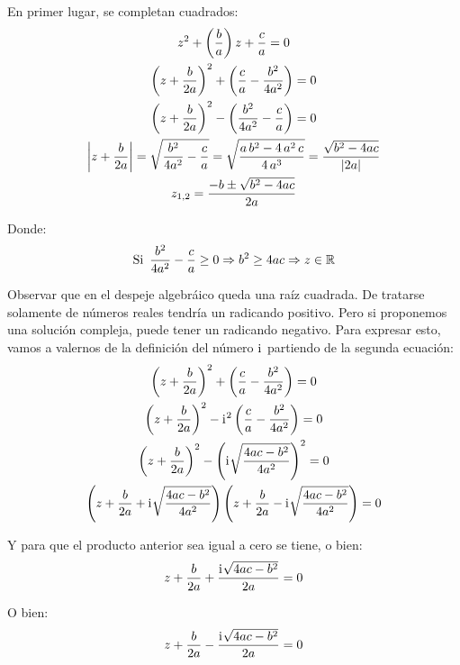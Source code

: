 \documentclass[a5paper,12pt,twoside]{book}
\begin{document}
En primer lugar, se completan cuadrados:
\begin{gather*}
    z^2 + \left(\frac{b}{a} \right) z + \frac{c}{a} = 0
    \\
    \left( z+\frac{b}{2a} \right)^2 + \left( \frac{c}{a}-\frac{b^2}{4a^2} \right) = 0
    \\
    \left( z+\frac{b}{2a} \right)^2 - \left( \frac{b^2}{4a^2} - \frac{c}{a} \right) = 0
    \\
    {\left| {z+\frac{b}{2a}} \right|} = \sqrt{\frac{b^2}{4a^2} - \frac{c}{a}}
    = \sqrt{\frac{a \, b^2 - 4 \, a^2 \, c}{4 \, a^3}}
    = \frac{\sqrt{b^2 - 4ac}}{{\left| {2a} \right|}}
    \\
    z_{1,2} = \frac{-b \pm \sqrt{b^2-4ac}}{2a}
\end{gather*}

Donde:
\begin{equation*}
    \textrm{Si} \enspace \frac{b^2}{4a^2} - \frac{c}{a} \geq 0 \Rightarrow b^2 \geq 4ac \Rightarrow z \in \mathbb{R}
\end{equation*}

Observar que en el despeje algebráico queda una raíz cuadrada.
De tratarse solamente de números reales tendría un radicando positivo.
Pero si proponemos una solución compleja, puede tener un radicando negativo.
Para expresar esto, vamos a valernos de la definición del número $\mathrm{i}\mkern1mu$ partiendo de la segunda ecuación:
\begin{gather*}
    \left( z+\frac{b}{2a} \right)^2 + \left( \frac{c}{a} - \frac{b^2}{4a^2} \right) = 0
    \\
    \left( z+\frac{b}{2a} \right)^2 - \iu^2 \left( \frac{c}{a}-\frac{b^2}{4a^2} \right) = 0
    \\
    \left( z+\frac{b}{2a} \right)^2 - \left( \iu \sqrt{\frac{4ac-b^2}{4a^2}} \right)^2 = 0
    \\
    \scale{0.98}
    {
    \left( z+\frac{b}{2a} + \iu \sqrt{\frac{4ac-b^2}{4a^2}} \right) \left( z+\frac{b}{2a} - \iu \sqrt{\frac{4ac-b^2}{4a^2}} \right) = 0
    }
\end{gather*}

Y para que el producto anterior sea igual a cero se tiene, o bien:
\begin{equation*}
    z + \frac{b}{2a} + \frac{\mathrm{i}\mkern1mu \sqrt{4ac-b^2}}{2a} = 0
\end{equation*}

O bien:
\begin{equation*}
    z + \frac{b}{2a} - \frac{\mathrm{i}\mkern1mu \sqrt{4ac-b^2}}{2a} = 0
\end{equation*}
\end{document}
